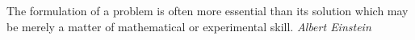 \documentclass[convert=imagemagick,density=300]{standalone}
\begin{document}
\parbox[t][36pt][c]{300pt}{
The formulation of a problem is often more essential than its solution
which may be merely a matter of mathematical or experimental skill.
\textit{Albert Einstein}
}
\end{document}
